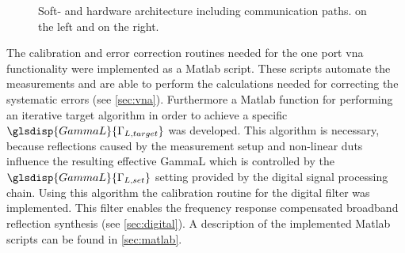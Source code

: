 \documentclass[12pt,a4paper,parskip=full,abstract=true,BCOR=12mm]{scrreprt}
\makeatletter
\newcommand\currentcoordinate{\the\tikz@lastxsaved,\the\tikz@lastysaved}
\makeatother
\begin{document}
\begin{figure}[htb]
    \caption[Soft- and hardware architecture including communication paths]{Soft- and hardware architecture including communication paths.  on the left and  on the right.}
    \label{fig:architecture}
\end{figure}

The calibration and error correction routines needed for the one port
\gls{vna} functionality were implemented as a Matlab script. These scripts
automate the measurements and are able to perform the calculations
needed for correcting the systematic errors (see \cref{sec:vna}). Furthermore
a Matlab function for performing an iterative target algorithm in order to
achieve a specific $\glsdisp{GammaL}{\Gamma_{L,target}}$ was developed. This algorithm
is necessary, because reflections caused by the measurement setup and
non-linear \glspl{dut} influence the resulting effective \gls{GammaL} which is controlled by the
$\glsdisp{GammaL}{\Gamma_{L,set}}$ setting provided by the digital signal
processing chain. Using this algorithm the calibration routine for the digital filter was
implemented. This filter enables the frequency response compensated broadband
reflection synthesis (see \cref{sec:digital}). A description
of the implemented Matlab scripts can be found in \cref{sec:matlab}.
\end{document}
